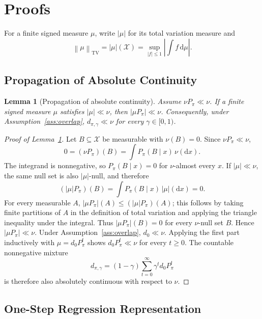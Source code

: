 \documentclass{article}
\newcommand{\sX}{\mathcal{X}}
\newcommand{\1}{\mathbf{1}}
\newcommand{\dd}{\mathrm{d}}
\newcommand{\Ppi}{P_\pi}
\newcommand{\dinit}{d_0}
\newcommand{\abs}[1]{\left\lvert #1 \right\rvert}
\newcommand{\tvnorm}[1]{\left\lVert #1 \right\rVert_{\mathrm{TV}}}
\theoremstyle{plain}
\newtheorem{lemma}[theorem]{Lemma}
\theoremstyle{definition}
\theoremstyle{remark}
\begin{document}


\appendix

\section{Proofs}
\label{app:proofs}

For a finite signed measure $\mu$, write $\abs{\mu}$ for its total variation measure and
\[
    \tvnorm{\mu}=\abs{\mu}(\sX)
    =
    \sup_{\abs{f}\leq 1}\abs{\int f\,\dd\mu}.
\]

\subsection{Propagation of Absolute Continuity}
\label{app:overlap}

\begin{lemma}[Propagation of absolute continuity]
\label{lem:ac-propagation}
Assume $\nu\Ppi\ll\nu$.
If a finite signed measure $\mu$ satisfies $\abs{\mu}\ll\nu$, then $\abs{\mu\Ppi}\ll\nu$.
Consequently, under Assumption~\ref{ass:overlap}, $d_{\pi,\gamma}\ll\nu$ for every $\gamma\in[0,1)$.
\end{lemma}

\begin{proof}[Proof of Lemma~\ref{lem:ac-propagation}]
Let $B\subseteq\sX$ be measurable with $\nu(B)=0$.
Since $\nu\Ppi\ll\nu$,
\[
    0=(\nu\Ppi)(B)=\int \Ppi(B\mid x)\,\nu(\dd x).
\]
The integrand is nonnegative, so $\Ppi(B\mid x)=0$ for $\nu$-almost every $x$.
If $\abs{\mu}\ll\nu$, the same null set is also $\abs{\mu}$-null, and therefore
\[
    (\abs{\mu}\Ppi)(B)=\int \Ppi(B\mid x)\,\abs{\mu}(\dd x)=0.
\]
For every measurable $A$, $\abs{\mu\Ppi}(A)\leq(\abs{\mu}\Ppi)(A)$; this follows by taking finite partitions of $A$ in the definition of total variation and applying the triangle inequality under the integral.
Thus $\abs{\mu\Ppi}(B)=0$ for every $\nu$-null set $B$.
Hence $\abs{\mu\Ppi}\ll\nu$.
Under Assumption~\ref{ass:overlap}, $\dinit\ll\nu$. Applying the first part inductively
with $\mu=\dinit\Ppi^t$ shows $\dinit\Ppi^t\ll\nu$ for every $t\geq 0$.
The countable nonnegative mixture
\[
    d_{\pi,\gamma}
    =
    (1-\gamma)\sum_{t=0}^\infty \gamma^t\dinit\Ppi^t
\]
is therefore also absolutely continuous with respect to $\nu$.
\end{proof}

\subsection{One-Step Regression Representation}
\end{document}

